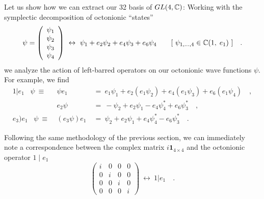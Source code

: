 \documentclass[a4paper,12pt]{book}
\begin{document}
Let us show how we can extract our 32 basis of $GL(4,\Bbb{C})$: Working with
the symplectic decomposition of octonionic ``states'' 
\begin{equation}
\psi =\left( 
\begin{array}{c}
{\psi _{1}} \\ 
{\psi _{2}} \\ 
{\psi _{3}} \\ 
{\psi _{4}}
\end{array}
\right) ~\leftrightarrow ~\psi _{1}+e_{2}\psi _{2}+e_{4}\psi _{3}+e_{6}\psi
_{4}\quad \quad [~\psi _{1,...,4}\in \Bbb{C}(1,\;e_{1})~]\quad .
\end{equation}
we analyze the action of left-barred operators on our octonionic wave
functions $\psi $. For example, we find 
\begin{eqnarray}
1|e_{1}\;\;\;\psi ~\equiv ~ &\psi e_{1}&~=~e_{1}\psi _{1}+e_{2}(e_{1}\psi
_{2})+e_{4}(e_{1}\psi _{3})+e_{6}(e_{1}\psi _{4})\quad , \\
&e_{2}\psi &~=~-\psi _{2}+e_{2}\psi _{1}-e_{4}\psi _{4}^{*}+e_{6}\psi
_{3}^{*}\quad , \\
e_{3}\mathbf{)}e_{1}\;\;\;\psi ~\equiv ~ &(e_{3}\psi )e_{1}&~=~\psi
_{2}+e_{2}\psi _{1}+e_{4}\psi _{4}^{*}-e_{6}\psi _{3}^{*}\quad .
\end{eqnarray}

Following the same methodology of the previous section, we can immediately
note a correspondence between the complex matrix $i\mathbf{1}_{4\times 4}$%
and the octonionic operator $1\mid e_{1}$%
\begin{equation}
\left( 
\begin{array}{cccc}
{i} & {0} & {0} & {0} \\ 
0 & i & 0 & 0 \\ 
0 & 0 & i & 0 \\ 
0 & 0 & 0 & i
\end{array}
\right) ~\leftrightarrow ~1|e_{1}\quad .
\end{equation}
\end{document}
